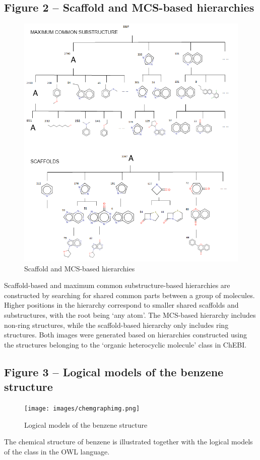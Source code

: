 \documentclass[10pt]{bmc_article}
\newenvironment{bmcformat}{\baselineskip20pt\sloppy\setboolean{publ}{false}}{\baselineskip20pt\sloppy}
\begin{document}
\begin{bmcformat}
\subsection*{Figure 2 -- Scaffold and MCS-based hierarchies}
\begin{figure}[htbp]
  \caption{Scaffold and MCS-based hierarchies}
  \label{fig:scaffolds}
  \centering
    \includegraphics[width=\textwidth]{images/scaffoldmcs.png}
\end{figure}
Scaffold-based and maximum common substructure-based hierarchies are constructed by searching for shared common parts between a group of molecules. Higher positions in the hierarchy correspond to smaller shared scaffolds and substructures, with the root being `any atom'. The MCS-based hierarchy includes non-ring structures, while the scaffold-based hierarchy only includes ring structures. Both images were generated based on hierarchies constructed using the structures belonging to the `organic heterocyclic molecule' class in ChEBI.


\subsection*{Figure 3 -- Logical models of the benzene structure}
\begin{figure}[htbp]
  \caption{Logical models of the benzene structure}
  \label{fig:benzene}
  \centering
    \texttt{[image: images/chemgraphimg.png]}
\end{figure}
The chemical structure of benzene is illustrated together with the logical models of the class in the OWL language.



\end{bmcformat}
\end{document}
